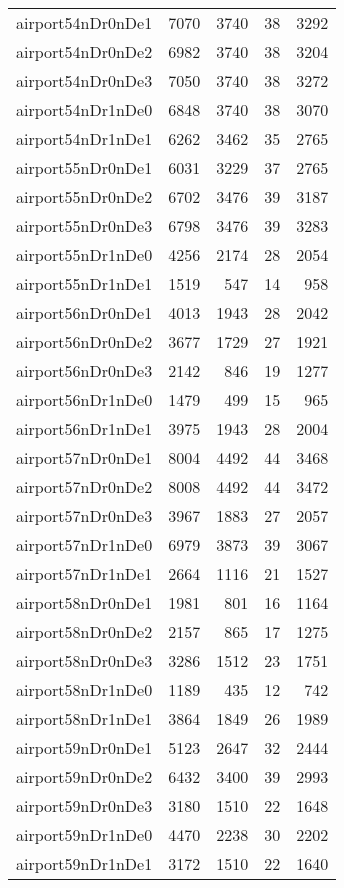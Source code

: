 \documentclass[../../../thesis.tex]{subfiles}
\begin{document}
\begin{longtable}{lrrrr}
airport54nDr0nDe1 & 7070 & 3740 & 38 & 3292 \\
airport54nDr0nDe2 & 6982 & 3740 & 38 & 3204 \\
airport54nDr0nDe3 & 7050 & 3740 & 38 & 3272 \\
airport54nDr1nDe0 & 6848 & 3740 & 38 & 3070 \\
airport54nDr1nDe1 & 6262 & 3462 & 35 & 2765 \\
airport55nDr0nDe1 & 6031 & 3229 & 37 & 2765 \\
airport55nDr0nDe2 & 6702 & 3476 & 39 & 3187 \\
airport55nDr0nDe3 & 6798 & 3476 & 39 & 3283 \\
airport55nDr1nDe0 & 4256 & 2174 & 28 & 2054 \\
airport55nDr1nDe1 & 1519 & 547 & 14 & 958 \\
airport56nDr0nDe1 & 4013 & 1943 & 28 & 2042 \\
airport56nDr0nDe2 & 3677 & 1729 & 27 & 1921 \\
airport56nDr0nDe3 & 2142 & 846 & 19 & 1277 \\
airport56nDr1nDe0 & 1479 & 499 & 15 & 965 \\
airport56nDr1nDe1 & 3975 & 1943 & 28 & 2004 \\
airport57nDr0nDe1 & 8004 & 4492 & 44 & 3468 \\
airport57nDr0nDe2 & 8008 & 4492 & 44 & 3472 \\
airport57nDr0nDe3 & 3967 & 1883 & 27 & 2057 \\
airport57nDr1nDe0 & 6979 & 3873 & 39 & 3067 \\
airport57nDr1nDe1 & 2664 & 1116 & 21 & 1527 \\
airport58nDr0nDe1 & 1981 & 801 & 16 & 1164 \\
airport58nDr0nDe2 & 2157 & 865 & 17 & 1275 \\
airport58nDr0nDe3 & 3286 & 1512 & 23 & 1751 \\
airport58nDr1nDe0 & 1189 & 435 & 12 & 742 \\
airport58nDr1nDe1 & 3864 & 1849 & 26 & 1989 \\
airport59nDr0nDe1 & 5123 & 2647 & 32 & 2444 \\
airport59nDr0nDe2 & 6432 & 3400 & 39 & 2993 \\
airport59nDr0nDe3 & 3180 & 1510 & 22 & 1648 \\
airport59nDr1nDe0 & 4470 & 2238 & 30 & 2202 \\
airport59nDr1nDe1 & 3172 & 1510 & 22 & 1640 \\

\end{longtable}
\end{document}
